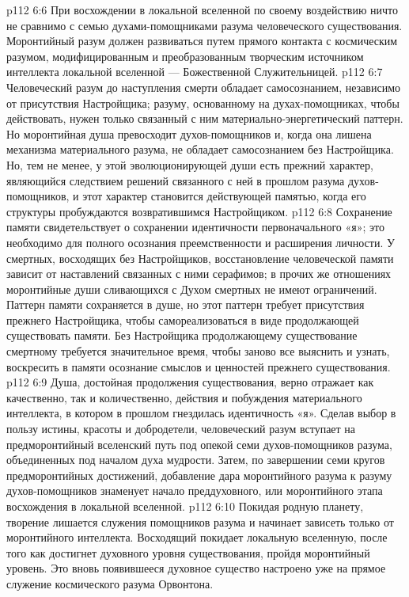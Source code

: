 \vs p112 6:6 При восхождении в локальной вселенной по своему воздействию ничто не сравнимо с семью духами\hyp{}помощниками разума человеческого существования. Моронтийный разум должен развиваться путем прямого контакта с космическим разумом, модифицированным и преобразованным творческим источником интеллекта локальной вселенной --- Божественной Служительницей.
\vs p112 6:7 \pc Человеческий разум до наступления смерти обладает самосознанием, независимо от присутствия Настройщика; разуму, основанному на духах\hyp{}помощниках, чтобы действовать, нужен только связанный с ним материально\hyp{}энергетический паттерн. Но моронтийная душа превосходит духов\hyp{}помощников и, когда она лишена механизма материального разума, не обладает самосознанием без Настройщика. Но, тем не менее, у этой эволюционирующей души есть прежний характер, являющийся следствием решений связанного с ней в прошлом разума духов\hyp{}помощников, и этот характер становится действующей памятью, когда его структуры пробуждаются возвратившимся Настройщиком.
\vs p112 6:8 Сохранение памяти свидетельствует о сохранении идентичности первоначального «я»; это необходимо для полного осознания преемственности и расширения личности. У смертных, восходящих без Настройщиков, восстановление человеческой памяти зависит от наставлений связанных с ними серафимов; в прочих же отношениях моронтийные души сливающихся с Духом смертных не имеют ограничений. Паттерн памяти сохраняется в душе, но этот паттерн требует присутствия прежнего Настройщика, чтобы  самореализоваться в виде продолжающей существовать памяти. Без Настройщика продолжающему существование смертному требуется значительное время, чтобы заново все выяснить и узнать, воскресить в памяти осознание смыслов и ценностей прежнего существования.
\vs p112 6:9 Душа, достойная продолжения существования, верно отражает как качественно, так и количественно, действия и побуждения материального интеллекта, в котором в прошлом гнездилась идентичность «я». Сделав выбор в пользу истины, красоты и добродетели, человеческий разум вступает на предморонтийный вселенский путь под опекой семи духов\hyp{}помощников разума, объединенных под началом духа мудрости. Затем, по завершении семи кругов предморонтийных достижений, добавление дара моронтийного разума к разуму духов\hyp{}помощников знаменует начало преддуховного, или моронтийного этапа восхождения в локальной вселенной.
\vs p112 6:10 \pc Покидая родную планету, творение лишается служения помощников разума и начинает зависеть только от моронтийного интеллекта. Восходящий покидает локальную вселенную, после того как достигнет духовного уровня существования, пройдя моронтийный уровень. Это вновь появившееся духовное существо настроено уже на прямое служение космического разума Орвонтона.
